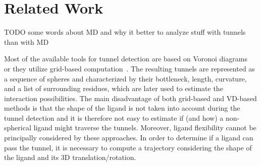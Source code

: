 \documentclass[usletter, 10pt, conference]{ieeeconf} %
\def\C{\mathcal{C}}
\begin{document}
\section{Related Work}


TODO some words about MD and why it better to analyze stuff with tunnels than with MD

Most of the available tools for tunnel detection are based on Voronoi diagrams~\cite{yaffe2008,caver3} or they utilize grid-based computation~\cite{sehnal2013mole}.
The resulting tunnels are represented as a sequence of spheres and characterized by their bottleneck, length, curvature, and a list of surrounding residues, which are later used to estimate the interaction possibilities.
The main disadvantage of both grid-based and VD-based methods is that the shape of the ligand is not taken into account during the tunnel detection and it is therefore not easy to estimate if (and how) a non-spherical ligand might traverse the tunnels.
Moreover, ligand flexibility cannot be principally considered by these approaches.
In order to determine if a ligand can pass the tunnel, it is necessary to compute a trajectory considering the shape of the ligand and its 3D translation/rotation.
\end{document}
